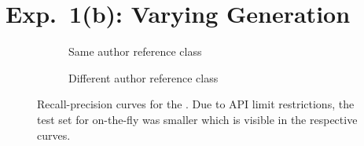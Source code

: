 \section{Exp.\ 1(b): Varying \Imp{} Generation}

\begin{figure}[H]
  \centering
  \begin{subfigure}{\textwidth}
    \centering
    
    \caption{Same author reference class}
    \label{fig:student_essays_same_author}
  \end{subfigure}
  \begin{subfigure}{\textwidth}
    \centering
    
    \caption{Different author reference class}
    \label{fig:student_essays_different_author}
  \end{subfigure}
  \caption[Recall-precision curves for the \dataStudent{}.]{Recall-precision curves for the \dataStudent{}. 
Due to API limit restrictions, the test set for on-the-fly was smaller which is visible in the respective curves.
  }
  \label{fig:diff_imp_gen_student_essays}
\end{figure}
